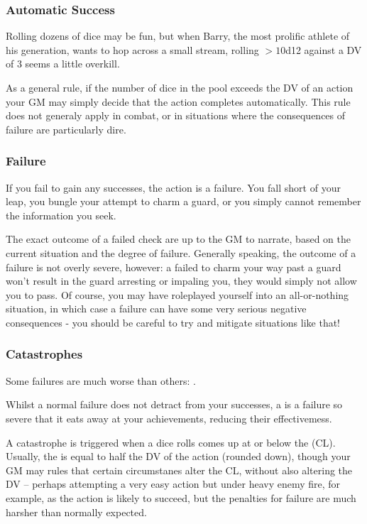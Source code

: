 \subsubsection{Automatic Success}

Rolling dozens of dice may be fun, but when Barry, the most prolific athlete of his generation, wants to hop across a small stream, rolling $>10$d12 against a DV of 3 seems a little overkill. 

As a general rule, if the number of dice in the pool exceeds the DV of an action your GM may simply decide that the action completes automatically. This rule does not generaly apply in combat, or in situations where the consequences of failure are particularly dire. 

\subsubsection{Failure}

If you fail to gain any successes, the action is a failure. You fall short of your leap, you bungle your attempt to charm a guard, or you simply cannot remember the information you seek. 

The exact outcome of a failed check are up to the GM to narrate, based on the current situation and the degree of failure. Generally speaking, the outcome of a failure is not overly severe, however: a failed  to charm your way past a guard won't result in the guard arresting or impaling you, they would simply not allow you to pass. Of course, you may have roleplayed yourself into an all-or-nothing situation, in which case a failure can have some very serious negative consequences - you should be careful to try and mitigate situations like that!

\subsubsection{Catastrophes} 

Some failures are much worse than others: . 

Whilst a normal failure does not detract from your successes, a  is a failure so severe that it eats away at your achievements, reducing their effectivemess. 


A catastrophe is triggered when a dice rolls comes up at or below the  (CL). Usually, the  is equal to half the DV of the action (rounded down), though your GM may rules that certain circumstanes alter the CL, without also altering the DV -- perhaps attempting a very easy action but under heavy enemy fire, for example, as the action is likely to succeed, but the penalties for failure are much harsher than normally expected.

